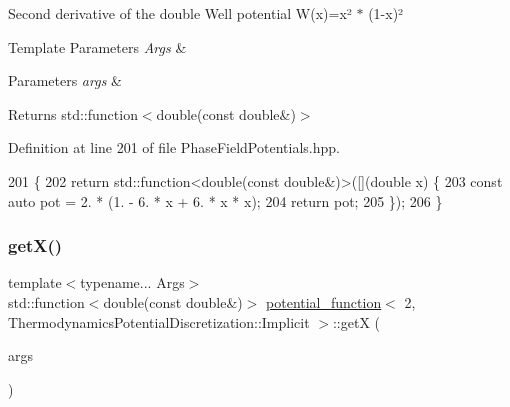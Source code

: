 Second derivative of the double Well potential W(x)=x² $\ast$ (1-\/x)² 


\begin{DoxyTemplParams}{Template Parameters}
{\em Args} & \\
\hline
\end{DoxyTemplParams}

\begin{DoxyParams}{Parameters}
{\em args} & \\
\hline
\end{DoxyParams}
\begin{DoxyReturn}{Returns}
std\+::function$<$double(const double\&)$>$ 
\end{DoxyReturn}


Definition at line 201 of file Phase\+Field\+Potentials.\+hpp.


\begin{DoxyCode}
201                                                         \{
202     \textcolor{keywordflow}{return} std::function<double(const double&)>([](\textcolor{keywordtype}{double} x) \{
203       \textcolor{keyword}{const} \textcolor{keyword}{auto} pot = 2. * (1. - 6. * x + 6. * x * x);
204       \textcolor{keywordflow}{return} pot;
205     \});
206   \}
\end{DoxyCode}
\mbox{\label{structpotential__function_3_012_00_01ThermodynamicsPotentialDiscretization_1_1Implicit_01_4_ab54d081097ca142aba4b7f4fc4a50f3b}} 
\subsubsection{\texorpdfstring{get\+X()}{getX()}}
{\footnotesize\ttfamily template$<$typename... Args$>$ \\
std\+::function$<$double(const double\&)$>$ \hyperlink{structpotential__function}{potential\+\_\+function}$<$ 2, Thermodynamics\+Potential\+Discretization\+::\+Implicit $>$\+::getX (\begin{DoxyParamCaption}\item[{Args...}]{args }\end{DoxyParamCaption})\hspace{0.3cm}{\ttfamily [inline]}}



